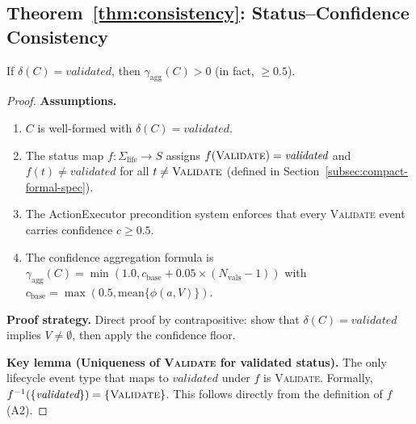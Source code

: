 \subsection{Theorem~\ref{thm:consistency}: Status--Confidence Consistency}

\begin{theorem}\label{thm:consistency}
If $\delta(C) = \textit{validated}$, then $\gamma_{\text{agg}}(C) > 0$ (in fact, $\geq 0.5$).
\end{theorem}

\begin{proof}
\textbf{Assumptions.}
\begin{enumerate}[label=(A\arabic*),leftmargin=2em]
    \item $C$ is well-formed with $\delta(C) = \textit{validated}$.
    \item The status map $f: \Sigma_{\text{life}} \to S$ assigns $f(\textsc{Validate}) = \textit{validated}$ and $f(t) \neq \textit{validated}$ for all $t \neq \textsc{Validate}$ (defined in Section~\ref{subsec:compact-formal-spec}).
    \item The ActionExecutor precondition system enforces that every \textsc{Validate} event carries confidence $c \geq 0.5$.
    \item The confidence aggregation formula is $\gamma_{\text{agg}}(C) = \min(1.0, c_{\text{base}} + 0.05 \times (N_{\text{vals}} - 1))$ with $c_{\text{base}} = \max(0.5, \text{mean}\{\phi(a, V)\})$.
\end{enumerate}

\textbf{Proof strategy.} Direct proof by contrapositive: show that $\delta(C) = \textit{validated}$ implies $V \neq \emptyset$, then apply the confidence floor.

\textbf{Key lemma (Uniqueness of \textsc{Validate} for validated status).} The only lifecycle event type that maps to $\textit{validated}$ under $f$ is \textsc{Validate}. Formally, $f^{-1}(\{\textit{validated}\}) = \{\textsc{Validate}\}$. This follows directly from the definition of $f$ (A2).


\end{proof}
